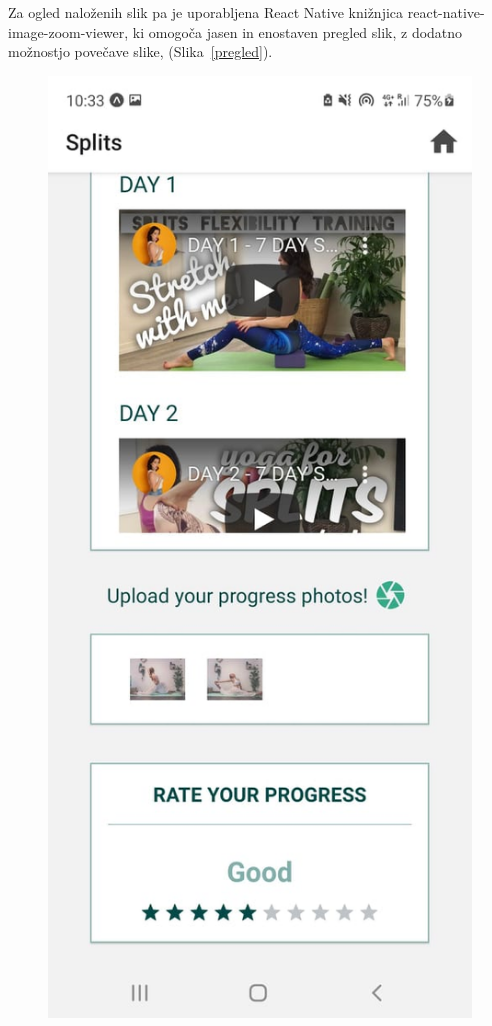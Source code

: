 \documentclass[a4paper, 12pt]{book}
\begin{document}
Za ogled naloženih slik pa je uporabljena React Native knižnjica react-native-image-zoom-viewer, ki omogoča jasen in enostaven pregled slik, z dodatno možnostjo povečave slike, (Slika~\ref{pregled}).\\

\begin{figure}[ht]
\centering
  \begin{minipage}[b]{0.4\textwidth}
    \includegraphics[width=\textwidth]{splitsscreen.jpg}\centering

\end{minipage}
\end{figure}
\end{document}
